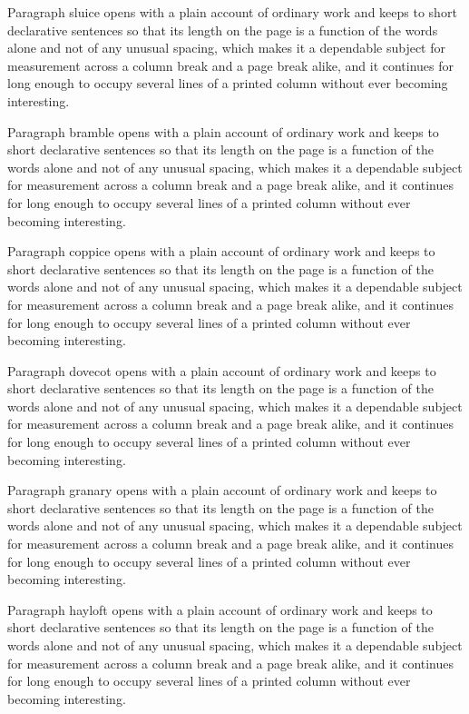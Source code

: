 \documentclass{article}
\begin{document}
Paragraph sluice opens with a plain account of ordinary work and keeps to short declarative sentences so that its length on the page is a function of the words alone and not of any unusual spacing, which makes it a dependable subject for measurement across a column break and a page break alike, and it continues for long enough to occupy several lines of a printed column without ever becoming interesting.

Paragraph bramble opens with a plain account of ordinary work and keeps to short declarative sentences so that its length on the page is a function of the words alone and not of any unusual spacing, which makes it a dependable subject for measurement across a column break and a page break alike, and it continues for long enough to occupy several lines of a printed column without ever becoming interesting.

Paragraph coppice opens with a plain account of ordinary work and keeps to short declarative sentences so that its length on the page is a function of the words alone and not of any unusual spacing, which makes it a dependable subject for measurement across a column break and a page break alike, and it continues for long enough to occupy several lines of a printed column without ever becoming interesting.

Paragraph dovecot opens with a plain account of ordinary work and keeps to short declarative sentences so that its length on the page is a function of the words alone and not of any unusual spacing, which makes it a dependable subject for measurement across a column break and a page break alike, and it continues for long enough to occupy several lines of a printed column without ever becoming interesting.

Paragraph granary opens with a plain account of ordinary work and keeps to short declarative sentences so that its length on the page is a function of the words alone and not of any unusual spacing, which makes it a dependable subject for measurement across a column break and a page break alike, and it continues for long enough to occupy several lines of a printed column without ever becoming interesting.

Paragraph hayloft opens with a plain account of ordinary work and keeps to short declarative sentences so that its length on the page is a function of the words alone and not of any unusual spacing, which makes it a dependable subject for measurement across a column break and a page break alike, and it continues for long enough to occupy several lines of a printed column without ever becoming interesting.
\end{document}
